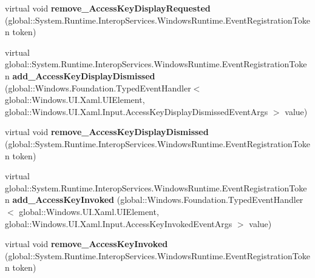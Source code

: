 \begin{DoxyCompactItemize}
\item 
\mbox{\label{class_windows_1_1_u_i_1_1_xaml_1_1_u_i_element_aa685659f05df9a84a04f9b4fba77ddf8}} 
virtual void {\bfseries remove\+\_\+\+Access\+Key\+Display\+Requested} (global\+::\+System.\+Runtime.\+Interop\+Services.\+Windows\+Runtime.\+Event\+Registration\+Token token)
\item 
\mbox{\label{class_windows_1_1_u_i_1_1_xaml_1_1_u_i_element_a15fc48463bdeec03ee1aee7533f254f0}} 
virtual global\+::\+System.\+Runtime.\+Interop\+Services.\+Windows\+Runtime.\+Event\+Registration\+Token {\bfseries add\+\_\+\+Access\+Key\+Display\+Dismissed} (global\+::\+Windows.\+Foundation.\+Typed\+Event\+Handler$<$ global\+::\+Windows.\+U\+I.\+Xaml.\+U\+I\+Element, global\+::\+Windows.\+U\+I.\+Xaml.\+Input.\+Access\+Key\+Display\+Dismissed\+Event\+Args $>$ value)
\item 
\mbox{\label{class_windows_1_1_u_i_1_1_xaml_1_1_u_i_element_a7a81e564e7ffcf9a6e1afd9c0e1dacc7}} 
virtual void {\bfseries remove\+\_\+\+Access\+Key\+Display\+Dismissed} (global\+::\+System.\+Runtime.\+Interop\+Services.\+Windows\+Runtime.\+Event\+Registration\+Token token)
\item 
\mbox{\label{class_windows_1_1_u_i_1_1_xaml_1_1_u_i_element_a15ef4390a0a3d7f9f3319b6729fd010b}} 
virtual global\+::\+System.\+Runtime.\+Interop\+Services.\+Windows\+Runtime.\+Event\+Registration\+Token {\bfseries add\+\_\+\+Access\+Key\+Invoked} (global\+::\+Windows.\+Foundation.\+Typed\+Event\+Handler$<$ global\+::\+Windows.\+U\+I.\+Xaml.\+U\+I\+Element, global\+::\+Windows.\+U\+I.\+Xaml.\+Input.\+Access\+Key\+Invoked\+Event\+Args $>$ value)
\item 
\mbox{\label{class_windows_1_1_u_i_1_1_xaml_1_1_u_i_element_a5aad5be80c6fdb9b329d9bc29673cd07}} 
virtual void {\bfseries remove\+\_\+\+Access\+Key\+Invoked} (global\+::\+System.\+Runtime.\+Interop\+Services.\+Windows\+Runtime.\+Event\+Registration\+Token token)
\item 
\mbox{\label{class_windows_1_1_u_i_1_1_xaml_1_1_u_i_element_a27bd7accff1583615f084e98079b911a}} 

\end{DoxyCompactItemize}
